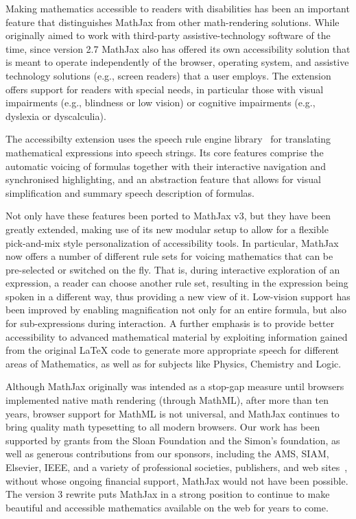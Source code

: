 \documentclass{article}
\begin{document}
Making mathematics accessible to readers with disabilities has been an
important feature that distinguishes MathJax from other math-rendering
solutions. While originally aimed to work with third-party assistive-technology
software of the time, since version 2.7 MathJax also has offered
its own accessibility solution that is meant to operate independently of
the browser, operating system, and assistive technology solutions (e.g.,
screen readers) that a user employs. The extension offers support for readers with
special needs, in particular those with visual impairments (e.g.,
blindness or low vision) or cognitive impairments (e.g., dyslexia or
dyscalculia).

The accessibilty extension uses the speech rule engine
library~\cite{SRE} for translating mathematical expressions into speech strings.
Its core features comprise the automatic voicing of formulas together
with their interactive navigation and synchronised highlighting, and an
abstraction feature that allows for visual simplification and summary
speech description of formulas.

Not only have these features been
ported to MathJax v3, but they have been greatly extended, making use of its new
modular setup to allow for a flexible pick-and-mix style
personalization of accessibility tools.
In particular, MathJax now offers a number of different rule sets for
voicing mathematics that can be pre-selected or switched on the
fly. That is, during interactive exploration of an expression, a reader can choose
another rule set, resulting in the expression being spoken in a different way,
thus providing a new view of it.  Low-vision
support has been improved by enabling magnification not only for an
entire formula, but also for sub-expressions during interaction. A
further emphasis is to provide better accessibility to advanced
mathematical material by exploiting information gained from the original
{\LaTeX} code to generate more appropriate speech for different areas of
Mathematics, as well as for subjects like Physics, Chemistry and Logic.

Although MathJax originally was intended as a stop-gap measure until
browsers implemented native math rendering (through MathML), after
more than ten years, browser support for MathML is not universal, and
MathJax continues to bring quality math typesetting to all modern
browsers.  Our work has been supported by grants from the Sloan
Foundation and the Simon's foundation, as well as generous
contributions from our sponsors, including the AMS, SIAM, Elsevier,
IEEE, and a variety of professional societies, publishers, and web
sites~\cite{MJ-sponsors}, without whose ongoing financial support,
MathJax would not have been possible.  The version 3 rewrite puts
MathJax in a strong position to continue to make beautiful and
accessible mathematics available on the web for years to come.
\end{document}
